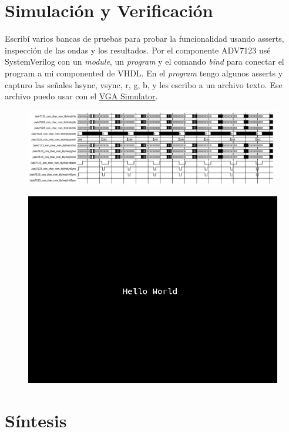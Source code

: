 \documentclass[a4paper]{article}
\begin{document}
\section{Simulación y Verificación}

Escribí varios bancas de pruebas para probar la funcionalidad usando asserts, inspección de las ondas y los resultados. Por el componente ADV7123 usé SystemVerilog con un \textit{module}, un \textit{program} y el comando \textit{bind} para conectar el program a mi componented de VHDL. En el \textit{program} tengo algunos asserts y capturo las señales hsync, vsync, r, g, b, y les escribo a un archivo texto. Ese archivo puedo usar con el \href{https://ericeastwood.com/lab/vga-simulator/}{VGA Simulator}.

\begin{figure}[!h]
\includegraphics[width=12cm]{img/adv7123.png}
\end{figure}

\begin{figure}[!h]
\includegraphics[width=12cm]{img/helloWorld.png}
\end{figure}

\section{Síntesis}
\end{document}
